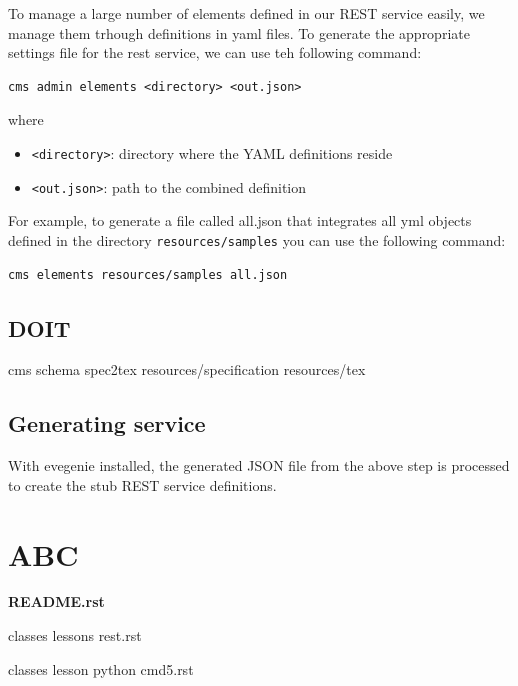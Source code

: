 \documentclass[9pt,twocolumn,twoside]{styles/osajnl}
\begin{document}
To manage a large number of elements defined in our REST service
easily, we manage them trhough definitions in yaml files. To generate
the appropriate settings file for the rest service, we can use teh
following command:

\begin{verbatim}
cms admin elements <directory> <out.json>
\end{verbatim}

where

\begin{itemize}
\item \verb+<directory>+: directory where the YAML definitions reside
\item \verb+<out.json>+: path to the combined definition
\end{itemize}

For example, to generate a file called all.json that integrates all
yml objects defined in the directory \verb+resources/samples+ you can
use the following command:

\begin{verbatim}
cms elements resources/samples all.json
\end{verbatim}

\subsection{DOIT}


cms schema spec2tex resources/specification resources/tex

\subsection{Generating service}

With evegenie installed, the generated JSON file from the above step
is processed to create the stub REST service definitions.


\section{ABC}
{\bf README.rst}

classes lessons rest.rst

classes lesson python cmd5.rst

\end{document}
